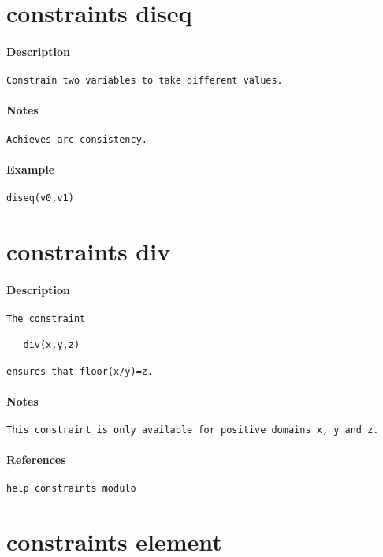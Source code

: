 \section{constraints diseq}
\paragraph{Description}
{\footnotesize
\begin{verbatim}
Constrain two variables to take different values.
\end{verbatim}
}
\paragraph{Notes}
{\footnotesize
\begin{verbatim}
Achieves arc consistency.
\end{verbatim}
}
\paragraph{Example}
{\footnotesize
\begin{verbatim}
diseq(v0,v1)
\end{verbatim}
}
\section{constraints div}
\paragraph{Description}
{\footnotesize
\begin{verbatim}
The constraint
 
   div(x,y,z)

ensures that floor(x/y)=z.
\end{verbatim}
}
\paragraph{Notes}
{\footnotesize
\begin{verbatim}
This constraint is only available for positive domains x, y and z.
\end{verbatim}
}
\paragraph{References}
{\footnotesize
\begin{verbatim}
help constraints modulo
\end{verbatim}
}
\section{constraints element}
